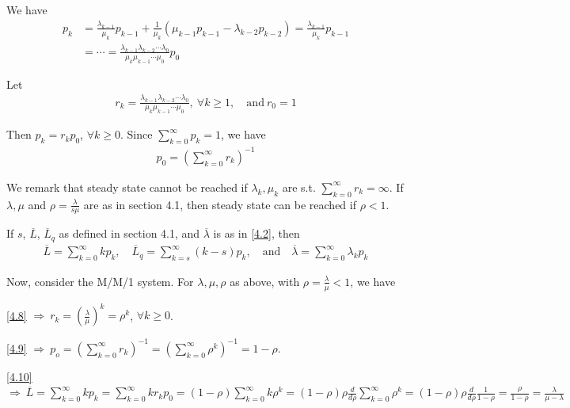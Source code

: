 We have
\begin{align*}
    p_k &= \frac{\lambda_{k-1}}{\mu_k} p_{k-1} + \frac{1}{\mu_k} \left(\mu_{k-1}p_{k-1} - \lambda_{k-2}p_{k-2} \right) = \frac{\lambda_{k-1}}{\mu_k} p_{k-1}  \\
    &= \cdots = \frac{\lambda_{k-1}\lambda_{k-2}\cdots \lambda_0}{\mu_k \mu_{k-1}\cdots \mu_0} p_0
\end{align*}

Let
\begin{align}
    r_k = \frac{\lambda_{k-1}\lambda_{k-2}\cdots\lambda_0}{\mu_k\mu_{k-1}\cdots \mu_0},\ \forall k\geqslant 1,\quad \text{and}\ r_0 = 1 \label{4.8}
\end{align}

Then $p_k = r_kp_0$, $\forall k\geqslant 0$. Since $\sum\limits_{k=0}^{\infty} p_k = 1$, we have
\begin{align}
    p_0 = \left( \sum\limits_{k=0}^{\infty} r_k\right)^{-1} \label{4.9}
\end{align}

We remark that steady state cannot be reached if $\lambda_k,\mu_k$ are s.t. $\sum\limits_{k=0}^{\infty} r_k = \infty$. If $\lambda,\mu$ and $\rho = \frac{\lambda}{s\mu}$ are as in section 4.1, then steady state can be reached if $\rho < 1$.

If $s$, $\overline{L}$, $\overline{L}_q$ as defined in section 4.1, and $\overline{\lambda}$ is as in \ref{4.2}, then 
\begin{align}
    \overline{L} = \sum\limits_{k=0}^{\infty} kp_k,\quad \overline{L}_q = \sum\limits_{k=s}^{\infty} (k-s)p_k,\quad \text{and} \quad \overline{\lambda} = \sum\limits_{k=0}^{\infty} \lambda_k p_k \label{4.10}
\end{align}

Now, consider the M/M/1 system. For $\lambda, \mu,\rho$ as above, with $\rho = \frac{\lambda}{\mu} < 1$, we have

\ref{4.8} $\Rightarrow\ r_k = \left(\frac{\lambda}{\mu}\right)^k = \rho^k$, $\forall k\geqslant 0$.

\ref{4.9} $\Rightarrow\ p_o = \left(\sum\limits_{k=0}^{\infty} r_k\right)^{-1} = \left(\sum\limits_{k=0}^{\infty} \rho^k \right)^{-1} = 1 - \rho$.

\ref{4.10} $\Rightarrow\ \overline{L} = \sum\limits_{k=0}^{\infty} kp_k = \sum\limits_{k=0}^{\infty} kr_kp_0 = (1-\rho) \sum\limits_{k=0}^{\infty} k\rho^k = (1-\rho) \rho \frac{d}{d\rho}\sum\limits_{k=0}^{\infty} \rho^k = (1-\rho) \rho \frac{d}{d\rho} \frac{1}{1-\rho} = \frac{\rho}{1-\rho} = \frac{\lambda}{\mu - \lambda}$

